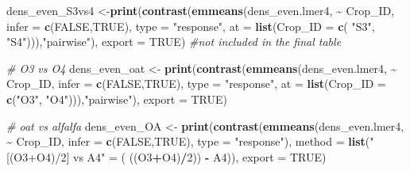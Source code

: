 \documentclass[
]{article}
\newenvironment{Shaded}{\begin{snugshade}}{\end{snugshade}}
\newcommand{\AttributeTok}[1]{\textcolor[rgb]{0.13,0.29,0.53}{#1}}
\newcommand{\CommentTok}[1]{\textcolor[rgb]{0.56,0.35,0.01}{\textit{#1}}}
\newcommand{\ConstantTok}[1]{\textcolor[rgb]{0.56,0.35,0.01}{#1}}
\newcommand{\DecValTok}[1]{\textcolor[rgb]{0.00,0.00,0.81}{#1}}
\newcommand{\FunctionTok}[1]{\textcolor[rgb]{0.13,0.29,0.53}{\textbf{#1}}}
\newcommand{\NormalTok}[1]{#1}
\newcommand{\OtherTok}[1]{\textcolor[rgb]{0.56,0.35,0.01}{#1}}
\newcommand{\SpecialCharTok}[1]{\textcolor[rgb]{0.81,0.36,0.00}{\textbf{#1}}}
\newcommand{\StringTok}[1]{\textcolor[rgb]{0.31,0.60,0.02}{#1}}
\begin{document}
\begin{Shaded}
\begin{Highlighting}[]
\NormalTok{dens\_even\_S3vs4 }\OtherTok{\textless{}{-}}\FunctionTok{print}\NormalTok{(}\FunctionTok{contrast}\NormalTok{(}\FunctionTok{emmeans}\NormalTok{(dens\_even.lmer4, }\SpecialCharTok{\textasciitilde{}}\NormalTok{ Crop\_ID,}
                                         \AttributeTok{infer =} \FunctionTok{c}\NormalTok{(}\ConstantTok{FALSE}\NormalTok{,}\ConstantTok{TRUE}\NormalTok{), }
                                         \AttributeTok{type =} \StringTok{"response"}\NormalTok{, }
                                         \AttributeTok{at =} \FunctionTok{list}\NormalTok{(}\AttributeTok{Crop\_ID =} \FunctionTok{c}\NormalTok{( }\StringTok{"S3"}\NormalTok{, }\StringTok{"S4"}\NormalTok{))),}\StringTok{"pairwise"}\NormalTok{),}
                        \AttributeTok{export =} \ConstantTok{TRUE}\NormalTok{) }\CommentTok{\#not included in the final table}

\CommentTok{\# O3 vs O4}
\NormalTok{dens\_even\_oat }\OtherTok{\textless{}{-}} \FunctionTok{print}\NormalTok{(}\FunctionTok{contrast}\NormalTok{(}\FunctionTok{emmeans}\NormalTok{(dens\_even.lmer4, }\SpecialCharTok{\textasciitilde{}}\NormalTok{ Crop\_ID,}
                                        \AttributeTok{infer =} \FunctionTok{c}\NormalTok{(}\ConstantTok{FALSE}\NormalTok{,}\ConstantTok{TRUE}\NormalTok{),}
                                        \AttributeTok{type =} \StringTok{"response"}\NormalTok{,}
                                        \AttributeTok{at =} \FunctionTok{list}\NormalTok{(}\AttributeTok{Crop\_ID =} \FunctionTok{c}\NormalTok{(}\StringTok{"O3"}\NormalTok{, }\StringTok{"O4"}\NormalTok{))),}\StringTok{"pairwise"}\NormalTok{), }\AttributeTok{export =} \ConstantTok{TRUE}\NormalTok{)}

\CommentTok{\# oat vs alfalfa}
\NormalTok{dens\_even\_OA }\OtherTok{\textless{}{-}} \FunctionTok{print}\NormalTok{(}\FunctionTok{contrast}\NormalTok{(}\FunctionTok{emmeans}\NormalTok{(dens\_even.lmer4, }\SpecialCharTok{\textasciitilde{}}\NormalTok{ Crop\_ID,}
                                       \AttributeTok{infer =} \FunctionTok{c}\NormalTok{(}\ConstantTok{FALSE}\NormalTok{,}\ConstantTok{TRUE}\NormalTok{), }
                                       \AttributeTok{type =} \StringTok{"response"}\NormalTok{), }
                               \AttributeTok{method =} \FunctionTok{list}\NormalTok{(}\StringTok{"[(O3+O4)/2] vs A4"} \OtherTok{=}\NormalTok{ ( ((O3}\SpecialCharTok{+}\NormalTok{O4)}\SpecialCharTok{/}\DecValTok{2}\NormalTok{)) }\SpecialCharTok{{-}}\NormalTok{ A4)), }\AttributeTok{export =} \ConstantTok{TRUE}\NormalTok{)}


\end{Highlighting}
\end{Shaded}
\end{document}
